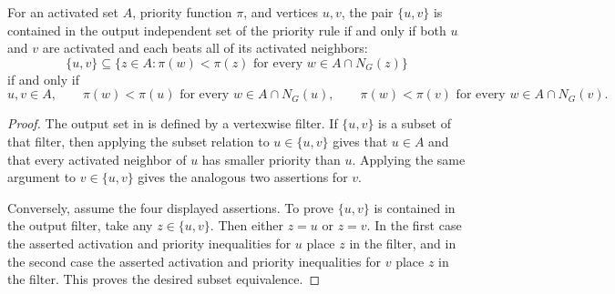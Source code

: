 \begin{helper}
For an activated set $A$, priority function $\pi$, and vertices $u,v$, the
pair $\{u,v\}$ is contained in the output independent set of the
 priority rule if and only if both
$u$ and $v$ are activated and each beats all of its activated neighbors:
\[
\{u,v\}\subseteq
\{z\in A:\pi(w)<\pi(z)\text{ for every }w\in A\cap N_G(z)\}
\]
if and only if
\[
u,v\in A,\qquad
\pi(w)<\pi(u)\text{ for every }w\in A\cap N_G(u),\qquad
\pi(w)<\pi(v)\text{ for every }w\in A\cap N_G(v).
\]
\end{helper}
\begin{proof}
The output set in  is defined by a
vertexwise filter.  If $\{u,v\}$ is a subset of that filter, then applying
the subset relation to $u\in\{u,v\}$ gives that $u\in A$ and that every
activated neighbor of $u$ has smaller priority than $u$.  Applying the same
argument to $v\in\{u,v\}$ gives the analogous two assertions for $v$.

Conversely, assume the four displayed assertions.  To prove
$\{u,v\}$ is contained in the output filter, take any
$z\in\{u,v\}$.  Then either $z=u$ or $z=v$.  In the first case the asserted
activation and priority inequalities for $u$ place $z$ in the filter, and in
the second case the asserted activation and priority inequalities for $v$
place $z$ in the filter.  This proves the desired subset equivalence.
\end{proof}
